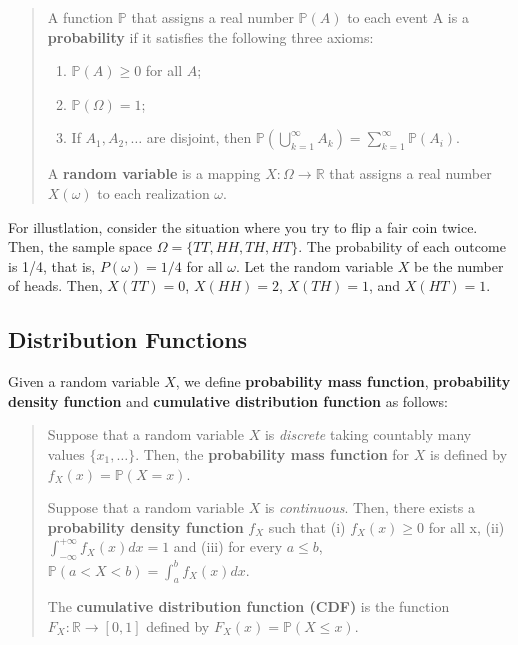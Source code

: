 \documentclass[
  12pt,
]{article}
\providecommand{\tightlist}{%
  \setlength{\itemsep}{0pt}\setlength{\parskip}{0pt}}
\begin{document}
\begin{quote}
A function \(\mathbb{P}\) that assigns a real number \(\mathbb{P}(A)\)
to each event A is a \textbf{probability} if it satisfies the following
three axioms:

\begin{enumerate}
\def\labelenumi{\arabic{enumi}.}
\tightlist
\item
  \(\mathbb{P}(A) \ge 0\) for all \(A\);
\item
  \(\mathbb{P}(\Omega) = 1\);
\item
  If \(A_1, A_2, \ldots\) are disjoint, then
  \(\mathbb{P}(\bigcup_{k=1}^{\infty}{A_k}) = \sum_{k=1}^{\infty} \mathbb{P}(A_i)\).
\end{enumerate}

A \textbf{random variable} is a mapping \(X: \Omega \to \mathbb{R}\)
that assigns a real number \(X(\omega)\) to each realization \(\omega\).
\end{quote}

For illustlation, consider the situation where you try to flip a fair
coin twice. Then, the sample space \(\Omega = \{ TT, HH, TH, HT \}\).
The probability of each outcome is 1/4, that is, \(P(\omega) = 1/4\) for
all \(\omega\). Let the random variable \(X\) be the number of heads.
Then, \(X(TT) = 0\), \(X(HH) = 2\), \(X(TH) = 1\), and \(X(HT) = 1\).

\hypertarget{distribution-functions}{%
\subsection{Distribution Functions}\label{distribution-functions}}

Given a random variable \(X\), we define \textbf{probability mass
function}, \textbf{probability density function} and \textbf{cumulative
distribution function} as follows:

\begin{quote}
Suppose that a random variable \(X\) is \emph{discrete} taking countably
many values \(\{x_1, \ldots\}\). Then, the \textbf{probability mass
function} for \(X\) is defined by \(f_X(x) = \mathbb{P}(X = x)\).

Suppose that a random variable \(X\) is \emph{continuous}. Then, there
exists a \textbf{probability density function} \(f_X\) such that (i)
\(f_X(x) \ge 0\) for all x, (ii)
\(\int_{-\infty}^{+\infty} f_X(x) dx = 1\) and (iii) for every
\(a \le b\), \(\mathbb{P}(a < X < b) = \int_a^b f_X(x)dx\).

The \textbf{cumulative distribution function (CDF)} is the function
\(F_X: \mathbb{R} \to [0, 1]\) defined by
\(F_X(x) = \mathbb{P}(X \le x)\).
\end{quote}
\end{document}
